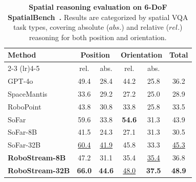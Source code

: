 \begin{table}[t]
    \centering
    \begin{minipage}[t]{0.56\textwidth} 
        \centering
        \vspace{0em}
        \setlength{\tabcolsep}{2.5pt} 
        \caption{\textbf{Spatial reasoning evaluation on 6-DoF SpatialBench~\cite{qisofar}.} Results are categorized by spatial VQA task types, covering absolute ($abs.$) and relative ($rel.$) reasoning for both position and orientation.}
        \label{tab:spatial_reasoning_final}
        \scriptsize
        \begin{tabular}{@{}lccccc@{}}
        \toprule
        \multirow{2}{*}{Method} & \multicolumn{2}{c}{Position} & \multicolumn{2}{c}{Orientation} & \multirow{2}{*}{Total} \\
        \cmidrule(lr){2-3} \cmidrule(lr){4-5}
        & rel. & abs. & rel. & abs. & \\
        \midrule
        GPT-4o~\cite{hurst2024gpt}      & 49.4 & 28.4 & 44.2 & 25.8 & 36.2 \\
        SpaceMantis~\cite{chen2024spatialvlm} & 33.6 & 29.2 & 27.2 & 25.0 & 28.9 \\
        RoboPoint~\cite{yuan2025robopoint}   & 43.8 & 30.8 & 33.8 & 25.8 & 33.5 \\
        SoFar~\cite{qisofar} & 59.6 & 33.8 & \cellcolor{firstpurple}\textbf{54.6} & 31.3 & 43.9 \\
        SoFar-8B~\cite{qisofar} & 41.5 & 24.3 & 27.1 & 31.3 & 30.5 \\
        SoFar-32B~\cite{qisofar} & \cellcolor{secondpurple}\underline{60.4} & \cellcolor{secondpurple}\underline{41.9} & 45.8 & 33.3 & \cellcolor{secondpurple}\underline{45.3} \\
        \textbf{RoboStream-8B} & 47.2 & 31.1 & 35.4 & \cellcolor{secondpurple}\underline{35.4} & 36.8 \\
        \textbf{RoboStream-32B} & \cellcolor{firstpurple}\textbf{66.0} & \cellcolor{firstpurple}\textbf{44.6} & \cellcolor{secondpurple}\underline{48.0} & \cellcolor{firstpurple}\textbf{37.5} & \cellcolor{firstpurple}\textbf{48.9} \\
        \bottomrule
        \end{tabular}
    \end{minipage}
    \hfill 
    \begin{minipage}[t]{0.42\textwidth} %
        \centering
        \setlength{\tabcolsep}{2pt} %
        \renewcommand{\arraystretch}{1.18} %

\end{minipage}
\end{table}
